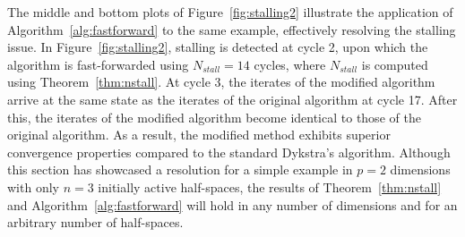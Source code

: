\documentclass[onecolumn]{autart}
\begin{document}
The middle and bottom plots of Figure~\ref{fig:stalling2} illustrate the application of Algorithm~\ref{alg:fastforward} to the same example, effectively resolving the stalling issue. In Figure~\ref{fig:stalling2}, stalling is detected at cycle 2, upon which the algorithm is fast-forwarded using $N_{stall}=14$ cycles, where $N_{stall}$ is computed using Theorem~\ref{thm:nstall}. At cycle 3, the iterates of the modified algorithm arrive at the same state as the iterates of the original algorithm at cycle 17. After this, the iterates of the modified algorithm become identical to those of the original algorithm. As a result, the modified method exhibits superior convergence properties compared to the standard Dykstra's algorithm. Although this section has showcased a resolution for a simple example in $p = 2$ dimensions with only $n=3$ initially active half-spaces, the results of Theorem~\ref{thm:nstall} and Algorithm~\ref{alg:fastforward} will hold in any number of dimensions and for an arbitrary number of half-spaces.


\end{document}
